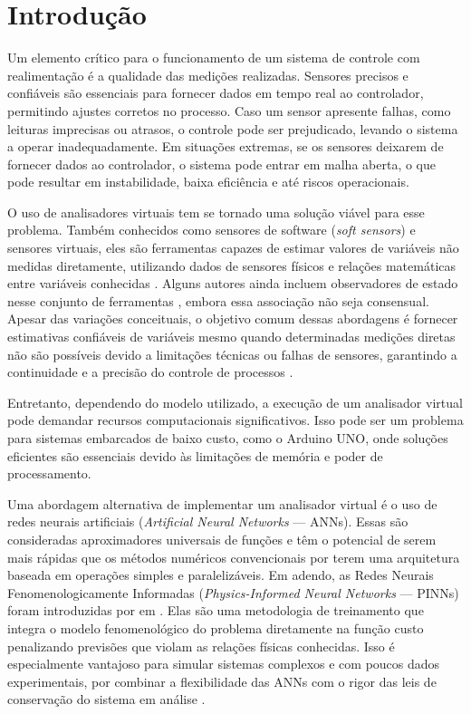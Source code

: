 \section{Introdução}

Um elemento crítico para o funcionamento de um sistema de controle com realimentação é a qualidade das medições realizadas.
Sensores precisos e confiáveis são essenciais para fornecer dados em tempo real ao controlador, permitindo ajustes corretos no processo.
Caso um sensor apresente falhas, como leituras imprecisas ou atrasos, o controle pode ser prejudicado, levando o sistema a operar inadequadamente.
Em situações extremas, se os sensores deixarem de fornecer dados ao controlador, o sistema pode entrar em malha aberta, o que pode resultar em instabilidade, baixa eficiência e até riscos operacionais.

O uso de analisadores virtuais tem se tornado uma solução viável para esse problema.
Também conhecidos como sensores de software (\textit{soft sensors}) e sensores virtuais, eles são ferramentas capazes de estimar valores de variáveis não medidas diretamente, utilizando dados de sensores físicos e relações matemáticas entre variáveis conhecidas \citep{martin_2021}.
Alguns autores ainda incluem observadores de estado nesse conjunto de ferramentas \citep{kadlec_2009, santos_2022}, embora essa associação não seja consensual.
Apesar das variações conceituais, o objetivo comum dessas abordagens é fornecer estimativas confiáveis de variáveis mesmo quando determinadas medições diretas não são possíveis devido a limitações técnicas ou falhas de sensores, garantindo a continuidade e a precisão do controle de processos \citep{adilton_2023}.

Entretanto, dependendo do modelo utilizado, a execução de um analisador virtual pode demandar recursos computacionais significativos.
Isso pode ser um problema para sistemas embarcados de baixo custo, como o Arduino UNO, onde soluções eficientes são essenciais devido às limitações de memória e poder de processamento.

Uma abordagem alternativa de implementar um analisador virtual é o uso de redes neurais artificiais (\textit{Artificial Neural Networks} — ANNs).
Essas são consideradas aproximadores universais de funções \citep{augustine_2024} e têm o potencial de serem mais rápidas que os métodos numéricos convencionais por terem uma arquitetura baseada em operações simples e paralelizáveis.
Em adendo, as Redes Neurais Fenomenologicamente Informadas (\textit{Physics-Informed Neural Networks} — PINNs) foram introduzidas por \citeauthor{raissi_2017_I} em \citeyear{raissi_2017_I}.
Elas são uma metodologia de treinamento que integra o modelo fenomenológico do problema diretamente na função custo penalizando previsões que violam as relações físicas conhecidas.
Isso é especialmente vantajoso para simular sistemas complexos e com poucos dados experimentais, por combinar a flexibilidade das ANNs com o rigor das leis de conservação do sistema em análise \citep{raissi_2019}.

